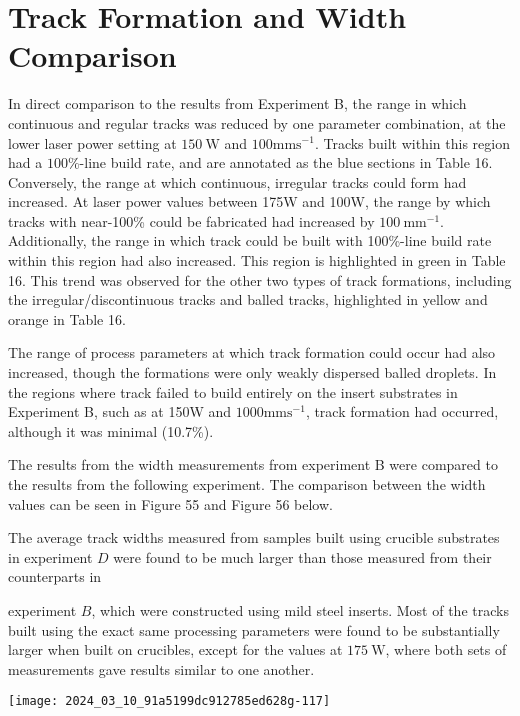 \documentclass[10pt]{article}
\begin{document}
\section*{Track Formation and Width Comparison}
In direct comparison to the results from Experiment B, the range in which continuous and regular tracks was reduced by one parameter combination, at the lower laser power setting at $150 \mathrm{~W}$ and $100 \mathrm{mms}^{-1}$. Tracks built within this region had a $100 \%$-line build rate, and are annotated as the blue sections in Table 16. Conversely, the range at which continuous, irregular tracks could form had increased. At laser power values between 175W and 100W, the range by which tracks with near-100\% could be fabricated had increased by $100 \mathrm{~mm}^{-1}$. Additionally, the range in which track could be built with 100\%-line build rate within this region had also increased. This region is highlighted in green in Table 16. This trend was observed for the other two types of track formations, including the irregular/discontinuous tracks and balled tracks, highlighted in yellow and orange in Table 16.

The range of process parameters at which track formation could occur had also increased, though the formations were only weakly dispersed balled droplets. In the regions where track failed to build entirely on the insert substrates in Experiment B, such as at 150W and $1000 \mathrm{mms}^{-1}$, track formation had occurred, although it was minimal (10.7\%).

The results from the width measurements from experiment B were compared to the results from the following experiment. The comparison between the width values can be seen in Figure 55 and Figure 56 below.

The average track widths measured from samples built using crucible substrates in experiment $D$ were found to be much larger than those measured from their counterparts in

experiment $B$, which were constructed using mild steel inserts. Most of the tracks built using the exact same processing parameters were found to be substantially larger when built on crucibles, except for the values at $175 \mathrm{~W}$, where both sets of measurements gave results similar to one another.

\begin{center}
\texttt{[image: 2024\_03\_10\_91a5199dc912785ed628g-117]}
\end{center}
\end{document}

